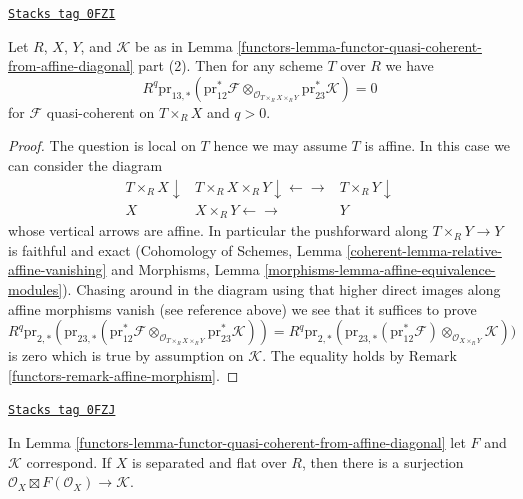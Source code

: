 \begin{lemma}
\label{functors-lemma-persistence-exactness}
\href{https://stacks.math.columbia.edu/tag/0FZI}{\texttt{Stacks tag 0FZI}}

Let $R$, $X$, $Y$, and $\mathcal{K}$ be as in
Lemma \ref{functors-lemma-functor-quasi-coherent-from-affine-diagonal} part (2).
Then for any scheme $T$ over $R$ we have
$$
R^q\text{pr}_{13, *}(\text{pr}_{12}^*\mathcal{F}
\otimes_{\mathcal{O}_{T \times_R X \times_R Y}}
\text{pr}_{23}^*\mathcal{K}) = 0
$$
for $\mathcal{F}$ quasi-coherent on $T \times_R X$ and $q > 0$.
\end{lemma}

\begin{proof}

The question is local on $T$ hence we may assume $T$ is affine.
In this case we can consider the diagram
$$
\begin{array}{ccc}T \times_R X \downarrow & T \times_R X \times_R Y \downarrow\longleftarrow\longrightarrow & T \times_R Y \downarrow \\ X & X \times_R Y \longleftarrow\longrightarrow & Y\end{array}
$$
whose vertical arrows are affine. In particular the pushforward along
$T \times_R Y \to Y$ is faithful and exact (Cohomology of Schemes,
Lemma \ref{coherent-lemma-relative-affine-vanishing} and
Morphisms, Lemma \ref{morphisms-lemma-affine-equivalence-modules}).
Chasing around in the diagram using that higher direct images along
affine morphisms vanish (see reference above) we see that
it suffices to prove
$$
R^q\text{pr}_{2, *}(
\text{pr}_{23, *}(\text{pr}_{12}^*\mathcal{F}
\otimes_{\mathcal{O}_{T \times_R X \times_R Y}}
\text{pr}_{23}^*\mathcal{K})) =
R^q\text{pr}_{2, *}(
\text{pr}_{23, *}(\text{pr}_{12}^*\mathcal{F})
\otimes_{\mathcal{O}_{X \times_R Y}}
\mathcal{K}))
$$
is zero which is true by assumption on $\mathcal{K}$.
The equality holds by Remark \ref{functors-remark-affine-morphism}.
\end{proof}

\begin{lemma}
\label{functors-lemma-functor-quasi-coherent-from-separated}
\href{https://stacks.math.columbia.edu/tag/0FZJ}{\texttt{Stacks tag 0FZJ}}

In Lemma \ref{functors-lemma-functor-quasi-coherent-from-affine-diagonal}
let $F$ and $\mathcal{K}$ correspond. If $X$ is separated and
flat over $R$, then there is a surjection
$\mathcal{O}_X \boxtimes F(\mathcal{O}_X) \to \mathcal{K}$.
\end{lemma}

